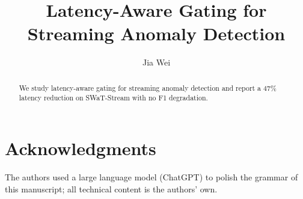 \documentclass{article}
\title{Latency-Aware Gating for Streaming Anomaly Detection}
\author{Jia Wei}
\begin{document}
\maketitle

\begin{abstract}
We study latency-aware gating for streaming anomaly detection and report a
47\% latency reduction on SWaT-Stream with no F1 degradation.
\end{abstract}

\section{Acknowledgments}
The authors used a large language model (ChatGPT) to polish the grammar of this
manuscript; all technical content is the authors' own.
\end{document}
